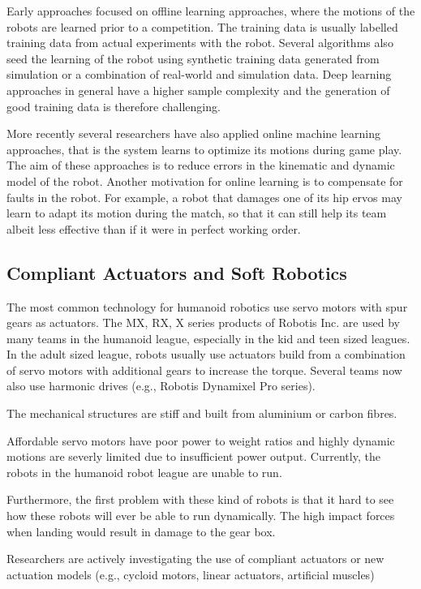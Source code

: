 \documentclass{article}
\begin{document}
Early approaches focused on offline learning approaches, where the motions of the robots are learned prior to a competition.
The training data is usually labelled training data from actual experiments with the robot.
Several algorithms also seed the learning of the robot using synthetic training data generated from simulation or a combination of real-world and simulation data.
Deep learning approaches in general have a higher sample complexity and the generation of good training data is therefore challenging.

More recently several researchers have also applied online machine learning approaches, that is the system learns to optimize its motions during game play.
The aim of these approaches is to reduce errors in the kinematic and dynamic model of the robot.
Another motivation for online learning is to compensate for faults in the robot. For example, a robot that damages one of its hip ervos may learn to adapt its motion during the match, so that it can still help its team albeit less effective than if it were in perfect working order.


\subsection{Compliant Actuators and Soft Robotics}

The most common technology for humanoid robotics use servo motors with spur gears as actuators.
The MX, RX, X series products of Robotis Inc. are used by many teams in the humanoid league, especially in the kid and teen sized leagues.
In the adult sized league, robots usually use actuators build from a combination of servo motors with additional gears to increase the torque.
Several teams now also use harmonic drives (e.g., Robotis Dynamixel Pro series).

The mechanical structures are stiff and built from aluminium or carbon fibres.

Affordable servo motors have poor power to weight ratios and highly dynamic motions are severly limited due to insufficient power output.
Currently, the robots in the humanoid robot league are unable to run.

Furthermore, the first problem with these kind of robots is that it hard to see how these robots will ever be able to run dynamically.
The high impact forces when landing would result in damage to the gear box.

Researchers are actively investigating the use of compliant actuators or new actuation models (e.g., cycloid motors, linear actuators, artificial muscles)
\end{document}
